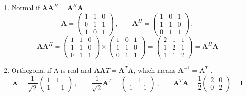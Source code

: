 \documentclass[12pt]{article}
\newcommand{\ve}[1]{\ensuremath{\mathbf{#1}}}
\begin{document}
\begin{enumerate}
\item Normal if $\ve{A}\ve{A}^H = \ve{A}^H\ve{A}$
%
\begin{equation}
\ve{A} = \begin{pmatrix}
   1 & 1 & 0 \\
   0 & 1 & 1 \\
   1 & 0 & 1
\end{pmatrix}\:, \qquad
\ve{A}^H = \begin{pmatrix}
   1 & 0 & 1 \\
   1 & 1 & 0 \\
   0 & 1 & 1
\end{pmatrix}\:,\nonumber
\end{equation}
%
\begin{equation}
\ve{AA}^H = \begin{pmatrix}
   1 & 1 & 0 \\
   1 & 1 & 0 \\
   0 & 1 & 1 
\end{pmatrix}  \times
\begin{pmatrix}
   1 & 0 & 1 \\
   1 & 1 & 0 \\
   0 & 1 & 1 
\end{pmatrix} =
\begin{pmatrix}
   2 & 1 & 1 \\
   1 & 2 & 1 \\
   1 & 1 & 2 
\end{pmatrix} = \ve{A}^H\ve{A}\nonumber
\end{equation}


\item Orthogonal if A is real and $\ve{AA}T = \ve{A}^T\ve{A}$, which means $\ve{A}^{-1} = \ve{A}^T$ .
%
\begin{equation}
\ve{A} = \frac{1}{\sqrt{2}}\begin{pmatrix}
   1 & 1 \\
   1 & -1 
\end{pmatrix}\:, \qquad
\frac{1}{\sqrt{2}}\ve{A}^T = \begin{pmatrix}
   1 & 1 \\
   1 & -1 
\end{pmatrix}\:,\qquad
\ve{A}^T\ve{A} = \frac{1}{2}\begin{pmatrix}
   2 & 0 \\
   0 & 2 
\end{pmatrix} = \ve{I} \nonumber
\end{equation}

\end{enumerate}
\end{document}
